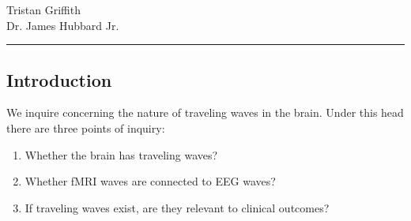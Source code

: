 \rhead{\today}
\begin{center}
{\large  Tristan Griffith}\\
\vspace{2mm}
{\large Dr. James Hubbard Jr.}
\noindent\rule{\textwidth}{2pt}
\end{center}
\setcounter{section}{1}

\subsection{Introduction}
We inquire concerning the nature of traveling waves in the brain. Under this head there are three points of inquiry:
\begin{enumerate}
\item Whether the brain has traveling waves?
\item Whether fMRI waves are connected to EEG waves?
\item If traveling waves exist, are they relevant to clinical outcomes?
\end{enumerate}
